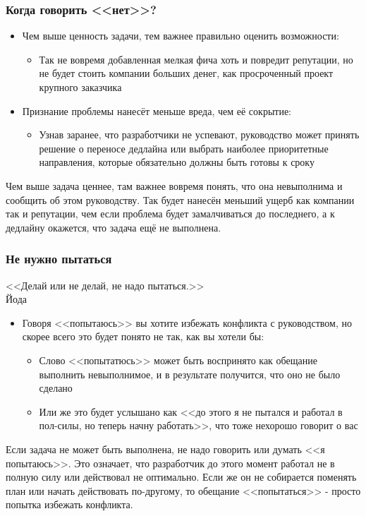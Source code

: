 \documentclass{../industrial-development}
\begin{document}
\begin{frame} \frametitle{Когда говорить <<нет>>?}
  \begin{itemize}
  \item Чем выше ценность задачи, тем важнее правильно оценить возможности:
		\begin{itemize}
		\item Так не вовремя добавленная мелкая фича хоть и повредит репутации, но не будет стоить компании больших денег, как просроченный проект крупного заказчика
		\end{itemize}
	\item Признание проблемы нанесёт меньше вреда, чем её сокрытие:
		\begin{itemize}
		\item Узнав заранее, что разработчики не успевают, руководство может принять решение о переносе дедлайна или выбрать наиболее приоритетные направления, которые обязательно должны быть готовы к сроку
		\end{itemize}
  \end{itemize}
\end{frame}
\lecturenotes
Чем выше задача ценнее, там важнее вовремя понять, что она невыполнима и сообщить об этом руководству.
Так будет нанесён меньший ущерб как компании так и репутации, чем если проблема будет замалчиваться до последнего, а к дедлайну окажется, что задача ещё не выполнена.

\begin{frame} \frametitle{Не нужно пытаться}
\begin{flushright}
<<Делай или не делай, не надо пытаться.>>\\
Йода
\end{flushright}
  \begin{itemize}
  \item Говоря <<попытаюсь>> вы хотите избежать конфликта с руководством, но скорее всего это будет понято не так, как вы хотели бы:
		\begin{itemize}
		\item Слово <<попытатюсь>> может быть воспринято как обещание выполнить невыполнимое, и в результате получится, что оно не было сделано
		\item Или же это будет услышано как <<до этого я не пытался и работал в пол-силы, но теперь начну работать>>, что тоже нехорошо говорит о вас
		\end{itemize}
  \end{itemize}
\end{frame}
\lecturenotes
Если задача не может быть выполнена, не надо говорить или думать <<я попытаюсь>>.
Это означает, что разработчик до этого момент работал не в полную силу или действовал не оптимально.
Если же он не собирается поменять план или начать действовать по-другому, то обещание <<попытаться>> - просто попытка избежать конфликта.
\end{document}

